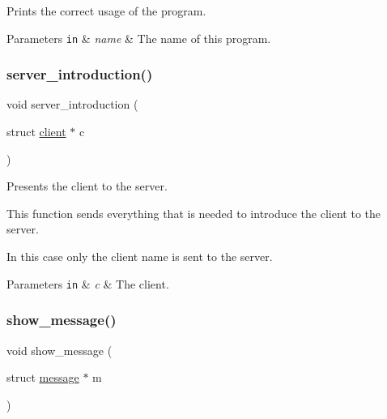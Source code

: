 Prints the correct usage of the program. 


\begin{DoxyParams}[1]{Parameters}
\mbox{\tt in}  & {\em name} & The name of this program. \\
\hline
\end{DoxyParams}
\mbox{\label{zip-zop-client_8c_acb0e43d47379736b891394dd383064be}} 
\subsubsection{\texorpdfstring{server\+\_\+introduction()}{server\_introduction()}}
{\footnotesize\ttfamily void server\+\_\+introduction (\begin{DoxyParamCaption}\item[{struct \hyperlink{structclient}{client} $\ast$}]{c }\end{DoxyParamCaption})}



Presents the client to the server. 

This function sends everything that is needed to introduce the client to the server.

In this case only the client name is sent to the server.


\begin{DoxyParams}[1]{Parameters}
\mbox{\tt in}  & {\em c} & The client. \\
\hline
\end{DoxyParams}
\mbox{\label{zip-zop-client_8c_aec5550cf115ba01d0da023ba9d1876bb}} 
\subsubsection{\texorpdfstring{show\+\_\+message()}{show\_message()}}
{\footnotesize\ttfamily void show\+\_\+message (\begin{DoxyParamCaption}\item[{struct \hyperlink{structmessage}{message} $\ast$}]{m }\end{DoxyParamCaption})}



